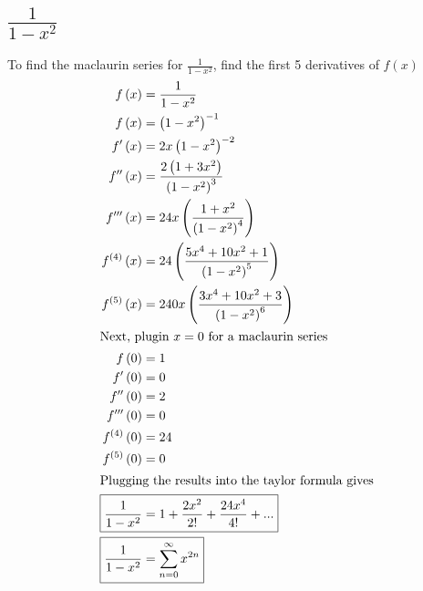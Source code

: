 \documentclass[12pt]{article}
\begin{document}
\section{\texorpdfstring{$\frac{1}{1-x^{2}}$}{Lg}}
To find the maclaurin series for $\frac{1}{1-x^{2}}$, find the first 5 derivatives of $f(x)$
\begin{align}
  f\left(x\right)                  & =\frac{1}{1-x^{2}}                                                  \\
  f\left(x\right)                  & =\left(1-x^{2}\right)^{-1}                                          \\
  f'\left(x\right)                 & =2x\left(1-x^{2}\right)^{-2}                                        \\
  f''\left(x\right)                & =\frac{2\left(1+3x^{2}\right)}{\left(1-x^{2}\right)^{3}}            \\
  f'''\left(x\right)               & =24x\left(\frac{1+x^{2}}{\left(1-x^{2}\right)^{4}}\right)           \\
  f^{\left(4\right)}\left(x\right) & =24\left(\frac{5x^{4}+10x^{2}+1}{\left(1-x^{2}\right)^{5}}\right)   \\
  f^{\left(5\right)}\left(x\right) & =240x\left(\frac{3x^{4}+10x^{2}+3}{\left(1-x^{2}\right)^{6}}\right) \\
  \intertext{Next, plugin $x=0$ for a maclaurin series}
  f\left(0\right)                  & =1                                                                  \\
  f'\left(0\right)                 & =0                                                                  \\
  f''\left(0\right)                & =2                                                                  \\
  f'''\left(0\right)               & =0                                                                  \\
  f^{\left(4\right)}\left(0\right) & =24                                                                 \\
  f^{\left(5\right)}\left(0\right) & =0                                                                  \\
  \intertext{Plugging the results into the taylor formula gives}
  \Aboxed{\frac{1}{1-x^{2}}                & =1+\frac{2x^{2}}{2!}+\frac{24x^{4}}{4!}+...}                         \\
  \Aboxed{\frac{1}{1-x^{2}}                & =\sum_{n=0}^{\infty}x^{2n}}                                         
\end{align}
\end{document}
